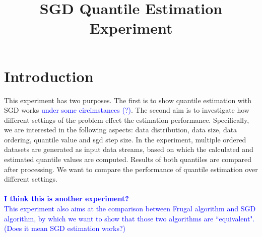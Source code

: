 \documentclass[12pt]{article}
\title{SGD Quantile Estimation Experiment}
\date{\vspace{-5ex}}
\begin{document}
\maketitle

\section{Introduction}

This experiment has two purposes. The first is to show quantile estimation with SGD works \textcolor{blue}{ under some circimstances (?)}.
The second aim is to investigate how different settings of the problem effect the estimation performance. Specifically, we are interested in the following aspects: data distribution, data size, data ordering, quantile value and sgd step size.
In the experiment, multiple ordered datasets are generated as input data streams, based on which the calculated and estimated quantile values are computed. Results of both quantiles are compared after processing. We want to compare the performance of quantile estimation over different settings.
\\\\
\textcolor{blue}{
\textbf{I think this is another experiment?}
\\    
This experiment also aims at the comparison between Frugal algorithm and SGD algorithm, by which we want to show that those two algorithms are ``equivalent". 
\\
(Does it mean SGD estimation works?)}
\end{document}
